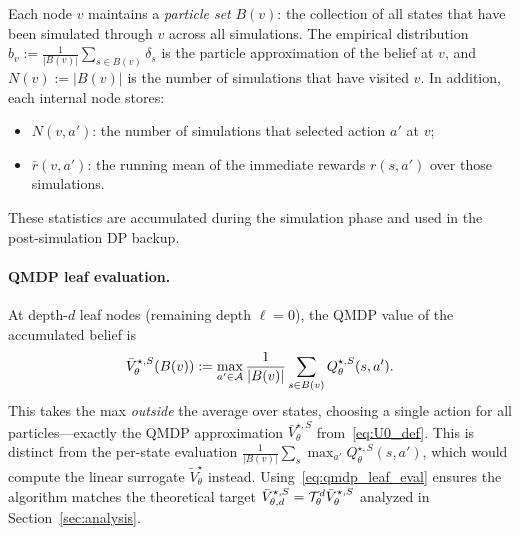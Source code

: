 Each node $v$ maintains a \emph{particle set} $B(v)$: the collection of all states that have been simulated through $v$ across all simulations.
The empirical distribution $\hat b_v:=\frac{1}{|B(v)|}\sum_{s\in B(v)}\delta_s$ is the particle approximation of the belief at $v$, and $N(v):=|B(v)|$ is the number of simulations that have visited $v$.
In addition, each internal node stores:
\begin{itemize}
\item $N(v,a')$: the number of simulations that selected action $a'$ at $v$;
\item $\bar r(v,a')$: the running mean of the immediate rewards $r(s,a')$ over those simulations.
\end{itemize}
These statistics are accumulated during the simulation phase and used in the post-simulation DP backup.

\paragraph{QMDP leaf evaluation.}
At depth-$d$ leaf nodes (remaining depth $\ell=0$), the QMDP value of the accumulated belief is
\begin{equation}\label{eq:qmdp_leaf_eval}
\bar V_\theta^{\star,S}(B(v)):=\max_{a'\in{\mathcal{A}}}\frac{1}{|B(v)|}\sum_{s\in B(v)}Q_\theta^{\star,S}(s,a').
\end{equation}
This takes the max \emph{outside} the average over states, choosing a single action for all particles---exactly the QMDP approximation $\bar V_\theta^{\star,S}$ from~\eqref{eq:U0_def}. This is distinct from the per-state evaluation $\frac{1}{|B(v)|}\sum_s\max_{a'}Q_\theta^{\star,S}(s,a')$, which would compute the linear surrogate $\widetilde V_\theta^{\star}$ instead. Using~\eqref{eq:qmdp_leaf_eval} ensures the algorithm matches the theoretical target $\bar V_{\theta,d}^{\star,S}={\mathcal{T}}_\theta^d\bar V_\theta^{\star,S}$ analyzed in Section~\ref{sec:analysis}.

